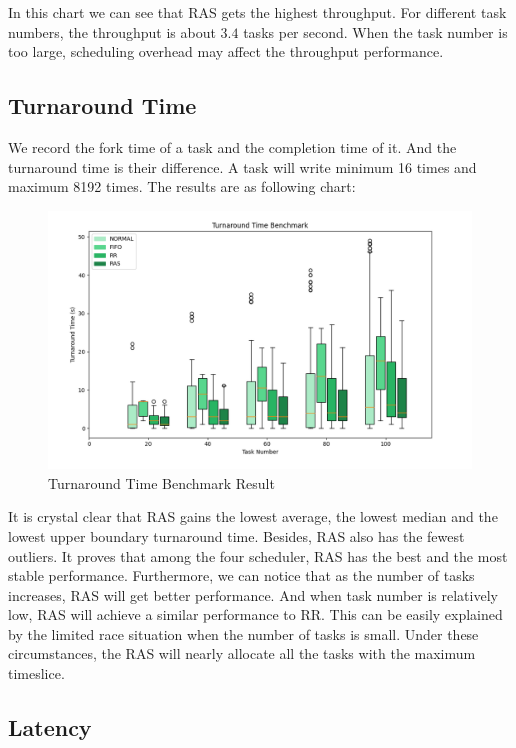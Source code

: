 In this chart we can see that RAS gets the highest throughput. For different task numbers, the throughput is about $3.4$ tasks per second. When the task number is too large, scheduling overhead may affect the throughput performance.

\subsection{Turnaround Time}

We record the fork time of a task and the completion time of it. And the turnaround time is their difference. A task will write minimum 16 times and maximum 8192 times. The results are as following chart:

\begin{figure}[!htp]
  \centering
  \includegraphics[width=13.5cm]{figures/turnaroundbox.png}
  \caption{Turnaround Time Benchmark Result}
  \label{fig:turnaroundbox}
\end{figure}

It is crystal clear that RAS gains the lowest average, the lowest median and the lowest upper boundary turnaround time. Besides, RAS also has the fewest outliers. It proves that among the four scheduler, RAS has the best and the most stable performance. Furthermore, we can notice that as the number of tasks increases, RAS will get better performance. And when task number is relatively low, RAS will achieve a similar performance to RR. This can be easily explained by the limited race situation when the number of tasks is small. Under these circumstances, the RAS will nearly allocate all the tasks with the maximum timeslice.

\subsection{Latency}

